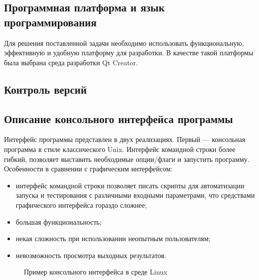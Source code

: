 \subsection {Программная платформа и язык программирования}
Для решения поставленной задачи необходимо использовать функциональную, эффективную и удобную платформу для разработки. В качестве такой платформы была выбрана среда разработки Qt Creator.

\subsection {Контроль версий}

\subsection{Описание консольного интерфейса программы}%
Интерфейс программы представлен в двух реализациях.
Первый — консольная программа в стиле классического Unix. Интерфейс командной строки более гибкий, позволяет выставить необходимые опции/флаги и запустить программу. Особенности в сравнении с графическим интерфейсом:
\begin{itemize}
\item интерфейс командной строки позволяет писать скрипты для автоматизации запуска и тестирования с различными входными параметрами, что средствами графического интерфейса гораздо сложнее;
\item большая функциональность;
\item некая сложность при использовании неопытным пользователям;
\item невозможность просмотра выходных результатов.
\end{itemize}

\begin{figure}[ht]
\caption{Пример консольного интерфейса в среде Linux}
\label{pic:con_scr}
\end{figure}

